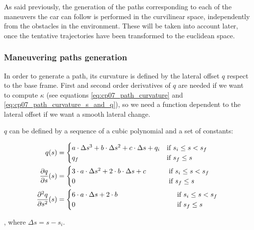 As said previously, the generation of the paths corresponding to each of the maneuvers the car can follow is performed in the curvilinear space, independently from the obstacles in the environment. These will be taken into account later, once the tentative trajectories have been transformed to the euclidean space.

\subsubsection{Maneuvering paths generation}\label{ch:chapter07_01_03_01}

In order to generate a path, its curvature is defined by the lateral offset $q$ respect to the base frame. First and second order derivatives of $q$ are needed if we want to compute $\kappa$ (see equations \ref{eq:cp07_path_curvature} and \ref{eq:cp07_path_curvature_s_and_q}), so we need a function dependent to the lateral offset if we want a smooth lateral change.

$q$ can be defined by a sequence of a cubic polynomial and a set of constants:

\begin{equation}\label{eq:cp07_function_q}
\begin{align*}
q(s) &=
  \begin{cases}
   a \cdot \Delta s^3 + b \cdot \Delta s^2 + c \cdot \Delta s + q_i & \text{if } s_i \le s < s_f \\
   q_f        & \text{if } s_f \le s
  \end{cases}\\
{{\partial q} \over {\partial s}}(s) &=
  \begin{cases}
   3 \cdot a \cdot \Delta s^2 + 2 \cdot b \cdot \Delta s + c & ~~~~~~~\text{if } s_i \le s < s_f \\
   0        & ~~~~~~~\text{if } s_f \le s
  \end{cases}\\
{{\partial^2 q} \over {\partial s^2}}(s) &=
  \begin{cases}
   6 \cdot a \cdot \Delta s + 2 \cdot b & ~~~~~~~~~~~~~~~~~~~~~~~\text{if } s_i \le s < s_f \\
   0        & ~~~~~~~~~~~~~~~~~~~~~~~\text{if } s_f \le s
  \end{cases}
\end{align*}
\end{equation}

, where $\Delta s = s - s_i$.

